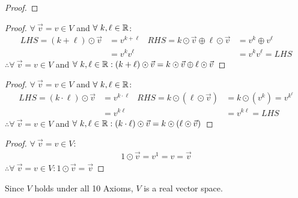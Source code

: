 \documentclass{article}
\begin{document}
\begin{enumerate}
\begin{proof}
    \end{proof}
    \begin{proof}
        $\forall~\vec{v} = v \in V$ and $\forall~k,\ell \in \mathbb{R}$:
        \begin{align*}
            LHS = (k + \ell) \odot \vec{v} & = v^{k+\ell} & RHS = k \odot \vec{v} \oplus \ell \odot \vec{v} & = v^k \oplus v^\ell \\
                                           & = v^kv^\ell  &                                                 & = v^kv^\ell = LHS
        \end{align*}
        $\therefore \forall~\vec{v} = v \in V$ and $\forall~k,\ell \in \mathbb{R}: (k + \ell) \odot \vec{v} = k \odot \vec{v} \oplus \ell \odot \vec{v}$
    \end{proof}
    \begin{proof}
        $\forall~\vec{v} = v \in V$ and $\forall~k,\ell \in \mathbb{R}$:
        \begin{align*}
            LHS = (k \cdot \ell) \odot \vec{v} & = v^{k \cdot \ell} & RHS = k \odot (\ell \odot \vec{v}) & = k \odot (v^k) = v^{k^\ell} \\
                                               & = v^{k\ell}        &                                    & = v^{k\ell} = LHS
        \end{align*}
        $\therefore \forall~\vec{v} = v \in V$ and $\forall~k,\ell \in \mathbb{R}: (k \cdot \ell) \odot \vec{v} = k \odot (\ell \odot \vec{v})$
    \end{proof}
    \begin{proof}
        $\forall~\vec{v} = v \in V$:
        \begin{align*}
            1 \odot \vec{v} = v^1 = v = \vec{v}
        \end{align*}
        $\therefore \forall~\vec{v} = v \in V: 1 \odot \vec{v} = \vec{v}$
    \end{proof}
    Since $V$ holds under all 10 Axioms, $V$ is a real vector space.
\end{enumerate}
\end{document}
